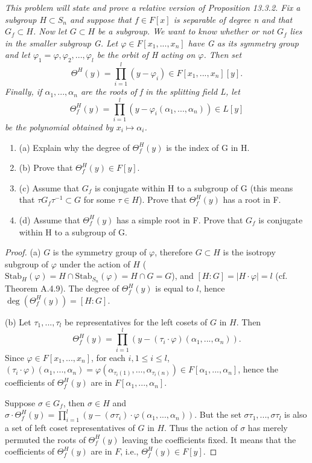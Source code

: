 \documentclass[11pt,a4paper]{article}
\newcommand{\be} {\begin{enumerate}}
\newcommand{\ee} {\end{enumerate}}
\begin{document}
{\it This problem will state and prove a relative version of Proposition 13.3.2. Fix a subgroup $H\subset S_n$ and suppose that $f\in F[x]$ is separable of degree n and that $G_f \subset H$. Now let $G \subset H$ be a subgroup. We want to know whether or not $G_f$ lies in the smaller subgroup G. Let $\varphi \in F[x_1,...,x_n]$ have G as its symmetry group and let $\varphi_1=\varphi,\varphi_2,...,\varphi_l$ be the orbit of H acting on $\varphi$. Then set $$\Theta^H(y)=\prod_{i=1}^l ( y - \varphi_i) \in F[x_1,...,x_n][y].$$ Finally, if $\alpha_1,...,\alpha_n$ are the roots of f in the splitting field L, let $$\Theta_f^H(y)=\prod_{i=1}^l ( y - \varphi_i(\alpha_1,...,\alpha_n))\in L[y]$$  be the polynomial obtained by $x_i \mapsto \alpha_i$.
\be
\item[(a)] Explain why the degree of $\Theta_f^H(y)$ is the index of G in H.
\item[(b)] Prove that $\Theta_f^H(y) \in F[y]$.
\item[(c)] Assume that $G_f$ is conjugate within H to a subgroup of G (this means that $\tau G_f \tau^{-1} \subset G$ for some $\tau \in H$). Prove that $\Theta_f^H(y)$ has a root in F.
\item[(d)] Assume that $\Theta_f^H(y)$ has a simple root in F. Prove that $G_f$ is conjugate within H to a subgroup of G.
\ee
\begin{proof}
\item[(a)] $G$ is the symmetry group of $\varphi$, therefore $G\subset H$ is the isotropy subgroup of $\varphi$ under the action of $H$ ($\mathrm{Stab}_H(\varphi) = H \cap \mathrm{Stab}_{S_n}(\varphi) = H \cap G = G$), and $[H:G]=|H\cdot \varphi|=l$ (cf. Theorem A.4.9). The degree of $\Theta_f^H(y)$ is equal to $l$, hence $\deg(\Theta_f^H(y))=[H:G]$. 
\item[(b)] Let $\tau_1,...,\tau_l$ be representatives for the left cosets of $G$ in $H$. Then $$\Theta_f^H(y)=\prod_{i=1}^l ( y - (\tau_i\cdot \varphi)(\alpha_1,...,\alpha_n)).$$ Since $\varphi \in F [x_1,...,x_n]$, for each $i, 1\leq i \leq l$, $(\tau_i \cdot\varphi)(\alpha_1,...,\alpha_n) = \varphi(\alpha_{\tau_i(1)}, \ldots, \alpha_{\tau_i(n)}) \in F [\alpha_1,...,\alpha_n]  $, hence the coefficients of $\Theta_f^H(y)$ are in $F [\alpha_1,...,\alpha_n]  $.

Suppose $\sigma \in G_f$, then $\sigma \in H$ and $\sigma\cdot \Theta_f^H(y)=\prod_{i=1}^l ( y - (\sigma\tau_i) \cdot \varphi(\alpha_1,...,\alpha_n))$. But the set $\sigma\tau_1,...,\sigma\tau_l$ is also a set of left coset representatives of $G$ in $H$. Thus the action of $\sigma$ has merely permuted the roots of $\Theta_f^H(y)$ leaving the coefficients fixed. It means that the coefficients of $\Theta_f^H(y)$ are in $F$, i.e., $\Theta_f^H(y) \in F[y]$. 


\end{proof}}
\end{document}
